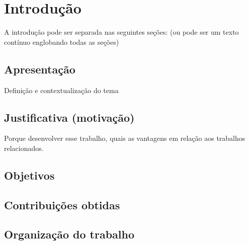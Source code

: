 \chapter{Introdução}

A introdução pode ser separada nas seguintes seções:  (ou pode ser um texto contínuo englobando todas as seções)

\section{Apresentação}
Definição e contextualização do tema
\section{Justificativa (motivação)}
Porque desenvolver esse trabalho, quais as vantagens em relação aos trabalhos relacionados.
\section{Objetivos}
\section{Contribuições obtidas}
\section{Organização do trabalho}
